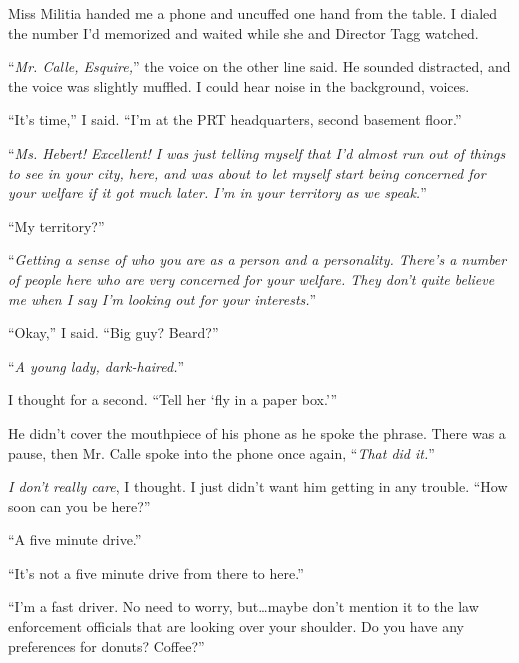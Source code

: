 





Miss Militia handed me a phone and uncuffed one hand from the table.  I dialed the number I'd memorized and waited while she and Director Tagg watched.



``\emph{Mr. Calle, Esquire,}'' the voice on the other line said.  He sounded distracted, and the voice was slightly muffled.  I could hear noise in the background, voices.



``It's time,'' I said.  ``I'm at the PRT headquarters, second basement floor.''



``\emph{Ms. Hebert!  Excellent!  I was just telling myself that I'd almost run out of things to see in your city, here, and was about to let myself start being concerned for your welfare if it got much later.  I'm in your territory as we speak.}''



``My territory?''



``\emph{Getting a sense of who you are as a person and a personality.  There's a number of people here who are very concerned for your welfare.  They don't quite believe me when I say I'm looking out for your interests.}''



``Okay,'' I said.  ``Big guy?  Beard?''



``\emph{A young lady, dark-haired.}''



I thought for a second.  ``Tell her `fly in a paper box.'''



He didn't cover the mouthpiece of his phone as he spoke the phrase.  There was a pause, then Mr. Calle spoke into the phone once again, ``\emph{That did it.}''



\emph{I don't really care}, I thought.  I just didn't want him getting in any trouble.  ``How soon can you be here?''



``A five minute drive.''



``It's not a five minute drive from there to here.''



``I'm a fast driver.  No need to worry, but\ldots maybe don't mention it to the law enforcement officials that are looking over your shoulder.  Do you have any preferences for donuts?  Coffee?''



